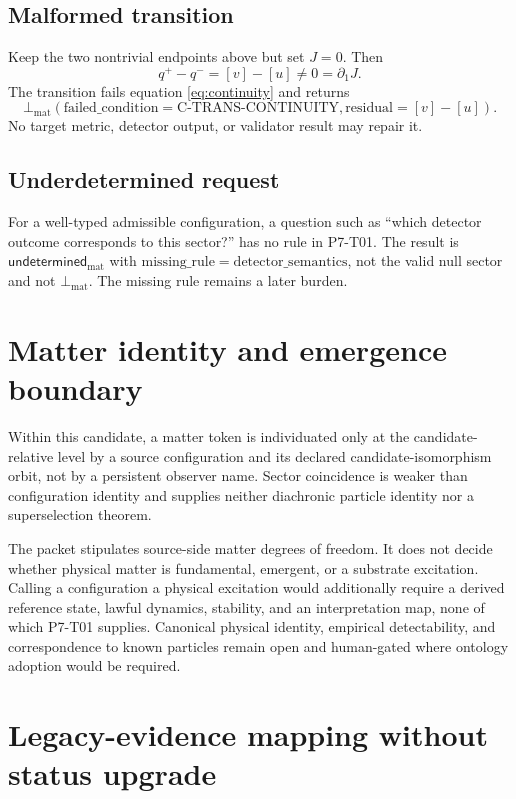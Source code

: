 \documentclass[11pt]{article}
\newcommand{\Malformed}{\bot_{\mathrm{mat}}}
\newcommand{\Undetermined}{\mathsf{undetermined}_{\mathrm{mat}}}
\begin{document}
\subsection{Malformed transition}

Keep the two nontrivial endpoints above but set \(J=0\). Then
\[
  q^+-q^-=[v]-[u]\neq0=\partial_1J.
\]
The transition fails equation \eqref{eq:continuity} and returns
\[
  \Malformed(
    \mathrm{failed\_condition}=\mathrm{C\mbox{-}TRANS\mbox{-}CONTINUITY},
    \mathrm{residual}=[v]-[u]).
\]
No target metric, detector output, or validator result may repair it.

\subsection{Underdetermined request}

For a well-typed admissible configuration, a question such as ``which
detector outcome corresponds to this sector?'' has no rule in P7-T01. The
result is \(\Undetermined\) with
\(\mathrm{missing\_rule}=\mathrm{detector\_semantics}\), not the valid null
sector and not \(\Malformed\). The missing rule remains a later burden.

\section{Matter identity and emergence boundary}

Within this candidate, a matter token is individuated only at the
candidate-relative level by a source configuration and its declared
candidate-isomorphism orbit, not by a persistent observer name. Sector
coincidence is weaker than configuration identity and supplies neither
diachronic particle identity nor a superselection theorem.

The packet stipulates source-side matter degrees of freedom. It does not
decide whether physical matter is fundamental, emergent, or a substrate
excitation. Calling a configuration a physical excitation would additionally
require a derived reference state, lawful dynamics, stability, and an
interpretation map, none of which P7-T01 supplies. Canonical physical identity,
empirical detectability, and correspondence to known particles remain open
and human-gated where ontology adoption would be required.

\section{Legacy-evidence mapping without status upgrade}
\end{document}
